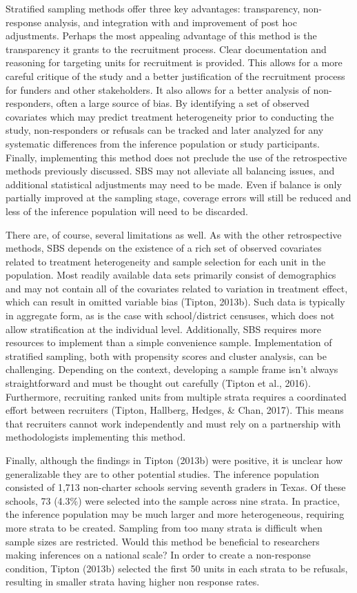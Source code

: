 \documentclass[man,floatsintext]{apa6}
\theoremstyle{definition}
\theoremstyle{definition}
\theoremstyle{definition}
\theoremstyle{remark}
\begin{document}
Stratified sampling methods offer three key advantages: transparency,
non-response analysis, and integration with and improvement of post hoc
adjustments. Perhaps the most appealing advantage of this method is the
transparency it grants to the recruitment process. Clear documentation
and reasoning for targeting units for recruitment is provided. This
allows for a more careful critique of the study and a better
justification of the recruitment process for funders and other
stakeholders. It also allows for a better analysis of non-responders,
often a large source of bias. By identifying a set of observed
covariates which may predict treatment heterogeneity prior to conducting
the study, non-responders or refusals can be tracked and later analyzed
for any systematic differences from the inference population or study
participants. Finally, implementing this method does not preclude the
use of the retrospective methods previously discussed. SBS may not
alleviate all balancing issues, and additional statistical adjustments
may need to be made. Even if balance is only partially improved at the
sampling stage, coverage errors will still be reduced and less of the
inference population will need to be discarded.

There are, of course, several limitations as well. As with the other
retrospective methods, SBS depends on the existence of a rich set of
observed covariates related to treatment heterogeneity and sample
selection for each unit in the population. Most readily available data
sets primarily consist of demographics and may not contain all of the
covariates related to variation in treatment effect, which can result in
omitted variable bias (Tipton, 2013b). Such data is typically in
aggregate form, as is the case with school/district censuses, which does
not allow stratification at the individual level. Additionally, SBS
requires more resources to implement than a simple convenience sample.
Implementation of stratified sampling, both with propensity scores and
cluster analysis, can be challenging. Depending on the context,
developing a sample frame isn't always straightforward and must be
thought out carefully (Tipton et al., 2016). Furthermore, recruiting
ranked units from multiple strata requires a coordinated effort between
recruiters (Tipton, Hallberg, Hedges, \& Chan, 2017). This means that
recruiters cannot work independently and must rely on a partnership with
methodologists implementing this method.

Finally, although the findings in Tipton (2013b) were positive, it is
unclear how generalizable they are to other potential studies. The
inference population consisted of 1,713 non-charter schools serving
seventh graders in Texas. Of these schools, 73 (4.3\%) were selected
into the sample across nine strata. In practice, the inference
population may be much larger and more heterogeneous, requiring more
strata to be created. Sampling from too many strata is difficult when
sample sizes are restricted. Would this method be beneficial to
researchers making inferences on a national scale? In order to create a
non-response condition, Tipton (2013b) selected the first 50 units in
each strata to be refusals, resulting in smaller strata having higher
non response rates.
\end{document}

